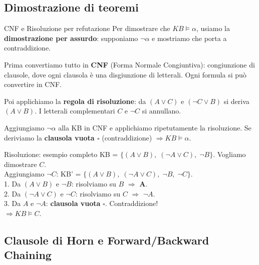 \documentclass[12pt,a4paper]{article}
\begin{document}
\subsection{Dimostrazione di teoremi}

\begin{narrativo}{CNF e Risoluzione per refutazione}
Per dimostrare che $KB \models \alpha$, usiamo la \textbf{dimostrazione per assurdo}: supponiamo $\neg\alpha$ e mostriamo che porta a contraddizione.

Prima convertiamo tutto in \textbf{CNF} (Forma Normale Congiuntiva): congiunzione di clausole, dove ogni clausola è una disgiunzione di letterali. Ogni formula si può convertire in CNF.

Poi applichiamo la \textbf{regola di risoluzione}: da $(A \lor C)$ e $(\neg C \lor B)$ si deriva $(A \lor B)$. I letterali complementari $C$ e $\neg C$ si annullano.

Aggiungiamo $\neg\alpha$ alla KB in CNF e applichiamo ripetutamente la risoluzione. Se deriviamo la \textbf{clausola vuota $\square$} (contraddizione) $\Rightarrow KB \models \alpha$.
\end{narrativo}

\begin{esempio}{Risoluzione: esempio completo}
KB = $\{(A \lor B),\; (\neg A \lor C),\; \neg B\}$. Vogliamo dimostrare $C$.\\
Aggiungiamo $\neg C$: KB' = $\{(A \lor B),\; (\neg A \lor C),\; \neg B,\; \neg C\}$.\\
1. Da $(A \lor B)$ e $\neg B$: risolviamo su $B$ $\Rightarrow$ \textbf{A}.\\
2. Da $(\neg A \lor C)$ e $\neg C$: risolviamo su $C$ $\Rightarrow$ $\neg A$.\\
3. Da $A$ e $\neg A$: \textbf{clausola vuota} $\square$. Contraddizione!\\
$\Rightarrow KB \models C$. \checkmark
\end{esempio}

\subsection{Clausole di Horn e Forward/Backward Chaining}
\end{document}
